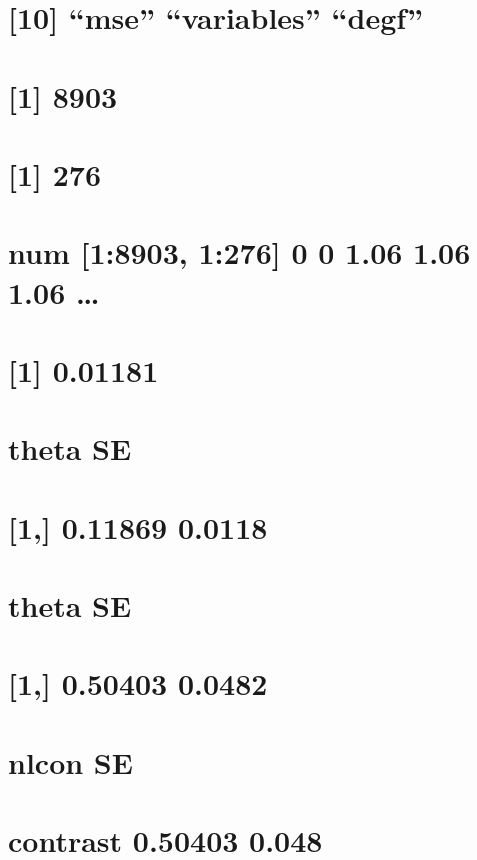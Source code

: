 \documentclass[]{book}
\theoremstyle{definition}
\theoremstyle{definition}
\theoremstyle{definition}
\theoremstyle{remark}
\begin{document}
\section{\texorpdfstring{{[}10{]} ``mse'' ``variables''
``degf''}{{[}10{]} mse variables degf}}\label{mse-variables-degf}

\section{{[}1{]} 8903}\label{section-15}

\section{{[}1{]} 276}\label{section-16}

\section{num {[}1:8903, 1:276{]} 0 0 1.06 1.06 1.06
\ldots{}}\label{num-18903-1276-0-0-1.06-1.06-1.06}

\section{{[}1{]} 0.01181}\label{section-17}

\section{theta SE}\label{theta-se}

\section{{[}1,{]} 0.11869 0.0118}\label{section-18}

\section{theta SE}\label{theta-se-1}

\section{{[}1,{]} 0.50403 0.0482}\label{section-19}

\section{nlcon SE}\label{nlcon-se}

\section{contrast 0.50403 0.048}\label{contrast-0.50403-0.048}
\end{document}
